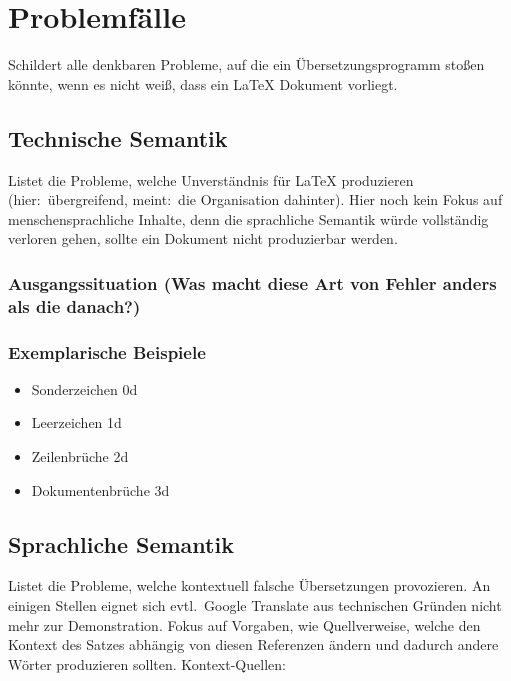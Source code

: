 \section{Problemfälle}%
Schildert alle denkbaren Probleme, auf die ein Übersetzungsprogramm stoßen könnte, wenn es nicht weiß, dass ein \LaTeX{} Dokument vorliegt.
\subsection{Technische Semantik}%
Listet die Probleme, welche Unverständnis für \LaTeX{} produzieren (hier:\ übergreifend, meint:\ die Organisation dahinter).
Hier noch kein Fokus auf menschensprachliche Inhalte, denn die sprachliche Semantik würde vollständig verloren gehen, sollte ein Dokument nicht produzierbar werden.

\subsubsection{Ausgangssituation (Was macht diese Art von Fehler anders als die danach?)}
\subsubsection{Exemplarische Beispiele}
\begin{itemize}
    \item Sonderzeichen 0d
    \item Leerzeichen 1d
    \item Zeilenbrüche 2d
    \item Dokumentenbrüche 3d
\end{itemize}

\subsection{Sprachliche Semantik}%
Listet die Probleme, welche kontextuell falsche Übersetzungen provozieren. An einigen Stellen eignet sich evtl.\ Google Translate aus technischen Gründen nicht mehr zur Demonstration.
Fokus auf Vorgaben, wie Quellverweise, welche den Kontext des Satzes abhängig von diesen Referenzen ändern und dadurch andere Wörter produzieren sollten.
Kontext-Quellen:
